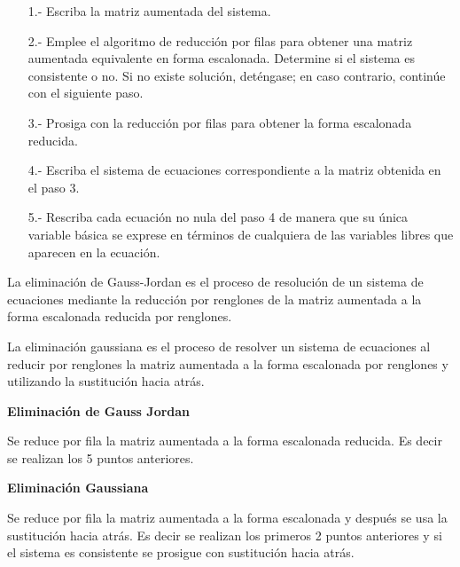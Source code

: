 \documentclass{article}
\begin{document}
\begin{tcolorbox}[colback=blue!10!white,colframe=blue!60!black,title=Uso de Reducción de Filas para Resolver un Sistema Lineal]
    \begin{itemize}
        \item[1.-] Escriba la matriz aumentada del sistema.
        \item[2.-] Emplee el algoritmo de reducción por filas para obtener una matriz aumentada equivalente en forma escalonada. Determine si el sistema es consistente o no. Si no existe solución, deténgase; en caso contrario, continúe con el siguiente paso.
        \item[3.-] Prosiga con la reducción por filas para obtener la forma escalonada reducida.
        \item[4.-] Escriba el sistema de ecuaciones correspondiente a la matriz obtenida en el paso 3.
        \item[5.-] Rescriba cada ecuación no nula del paso 4 de manera que su única variable básica se exprese en términos de cualquiera de las variables libres que aparecen en la ecuación. 
    \end{itemize}
\end{tcolorbox}

La eliminación de Gauss-Jordan es el proceso de resolución de un sistema de ecuaciones mediante la reducción por renglones de la matriz aumentada a la forma escalonada reducida por renglones.

La eliminación gaussiana es el proceso de resolver un sistema de ecuaciones al reducir por renglones la matriz aumentada a la forma escalonada por renglones y utilizando la sustitución hacia atrás.

\begin{tcolorbox}[colback=blue!10!white,colframe=blue!60!black,title=Métodos]
    \begin{large}
        \textbf{Eliminación de Gauss Jordan}
    \end{large}

    Se reduce por fila la matriz aumentada a la forma escalonada reducida. Es decir se realizan los 5 puntos anteriores. \newline

    \begin{large}
        \textbf{Eliminación Gaussiana}
    \end{large}

    Se reduce por fila la matriz aumentada a la forma escalonada y después se usa la sustitución hacia atrás. Es decir se realizan los primeros 2 puntos anteriores y si el sistema es consistente se prosigue con sustitución hacia atrás.
\end{tcolorbox}
\end{document}
